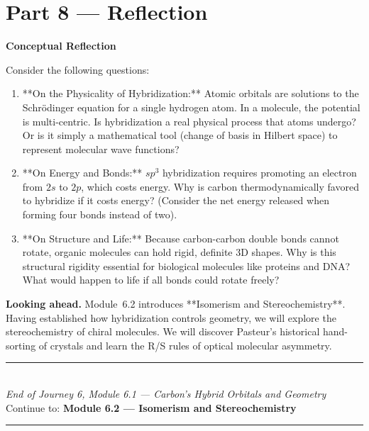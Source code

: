 \documentclass[12pt, a4paper]{book}
\begin{document}
\newpage

\section{Part 8 --- Reflection}

\begin{reflectionbox}
\textbf{Conceptual Reflection}

Consider the following questions:
\begin{enumerate}
  \item **On the Physicality of Hybridization:** Atomic orbitals are solutions to the Schrödinger equation for a single hydrogen atom. In a molecule, the potential is multi-centric. Is hybridization a real physical process that atoms undergo? Or is it simply a mathematical tool (change of basis in Hilbert space) to represent molecular wave functions?
  \item **On Energy and Bonds:** $sp^3$ hybridization requires promoting an electron from $2s$ to $2p$, which costs energy. Why is carbon thermodynamically favored to hybridize if it costs energy? (Consider the net energy released when forming four bonds instead of two).
  \item **On Structure and Life:** Because carbon-carbon double bonds cannot rotate, organic molecules can hold rigid, definite 3D shapes. Why is this structural rigidity essential for biological molecules like proteins and DNA? What would happen to life if all bonds could rotate freely?
\end{enumerate}
\end{reflectionbox}

\medskip
\noindent\textbf{Looking ahead.}
Module~6.2 introduces **Isomerism and Stereochemistry**. Having established how hybridization controls geometry, we will explore the stereochemistry of chiral molecules. We will discover Pasteur's historical hand-sorting of crystals and learn the R/S rules of optical molecular asymmetry.

\vspace{1.4cm}
\begin{center}
{\color{JourneyColor}\rule{0.5\linewidth}{0.8pt}}\\[6pt]
{\small\color{JourneyColor}\textit{End of Journey 6, Module 6.1 --- Carbon's Hybrid Orbitals and Geometry}}\\[4pt]
{\small\color{JourneyColor}Continue to: \textbf{Module 6.2 --- Isomerism and Stereochemistry}}\\[6pt]
{\color{JourneyColor}\rule{0.5\linewidth}{0.8pt}}
\end{center}
\end{document}
